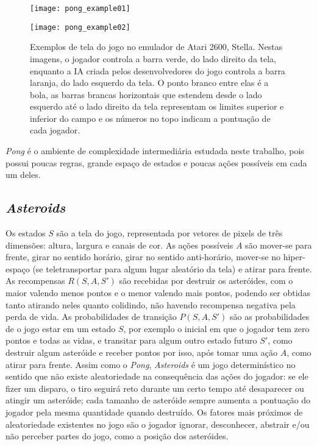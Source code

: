 \begin{figure}[h!]
  \begin{minipage}[b]{.5\textwidth}
  \centering
  \texttt{[image: pong\_example01]}
  \end{minipage}
  \hfill
  \begin{minipage}[b]{.5\textwidth}
  \texttt{[image: pong\_example02]}
  \end{minipage}
  \caption{Exemplos de tela do jogo no emulador de Atari 2600, Stella. Nestas imagens, o jogador controla a barra verde, do lado direito da tela, enquanto a IA criada pelos desenvolvedores do jogo controla a barra laranja, do lado esquerdo da tela. O ponto branco entre elas é a bola, as barras brancas horizontais que estendem desde o lado esquerdo até o lado direito da tela representam os limites superior e inferior do campo e os números no topo indicam a pontuação de cada jogador.}
\end{figure}

\textit{Pong} é o ambiente de complexidade intermediária estudada neste trabalho, pois possui poucas regras, grande espaço de estados e poucas ações possíveis em cada um deles.

\subsection{\textit{Asteroids}}
\label{sec:env_asteroids}

Os estados $S$ são a tela do jogo, representada por vetores de pixels de três dimensões: altura, largura e canais de cor.
As ações possíveis $A$ são mover-se para frente, girar no sentido horário, girar no sentido anti-horário, mover-se no hiper-espaço (se teletransportar para algum lugar aleatório da tela) e atirar para frente.
As recompensas $R(S,A,S')$ são recebidas por destruir os asteróides, com o maior valendo menos pontos e o menor valendo mais pontos, podendo ser obtidas tanto atirando neles quanto colidindo, não havendo recompensa negativa pela perda de vida.
As probabilidades de transição $P(S,A,S')$ são as probabilidades de o jogo estar em um estado $S$, por exemplo o inicial em que o jogador tem zero pontos e todas as vidas, e transitar para algum outro estado futuro $S'$, como destruir algum asteróide e receber pontos por isso, após tomar uma ação $A$, como atirar para frente.
Assim como o \textit{Pong}, \textit{Asteroids} é um jogo determinístico no sentido que não existe aleatoriedade na consequência das ações do jogador: se ele fizer um disparo, o tiro seguirá reto durante um certo tempo até desaparecer ou atingir um asteróide; cada tamanho de asteróide sempre aumenta a pontuação do jogador pela mesma quantidade quando destruído.
Os fatores mais próximos de aleatoriedade existentes no jogo são o jogador ignorar, desconhecer, abstrair e/ou não perceber partes do jogo, como a posição dos asteróides.


